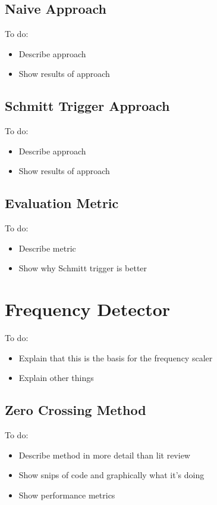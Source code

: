 \subsection{Naive Approach}

\color{red}
To do:
\begin{itemize}
	\item Describe approach
	\item Show results of approach
\end{itemize}
\color{black}

\subsection{Schmitt Trigger Approach}

\color{red}
To do:
\begin{itemize}
	\item Describe approach
	\item Show results of approach
\end{itemize}
\color{black}

\subsection{Evaluation Metric}

\color{red}
To do:
\begin{itemize}
	\item Describe metric
	\item Show why Schmitt trigger is better
\end{itemize}
\color{black}

\section{Frequency Detector}

\color{red}
To do:
\begin{itemize}
	\item Explain that this is the basis for the frequency scaler
	\item Explain other things
\end{itemize}
\color{black}

\subsection{Zero Crossing Method}

\color{red}
To do:
\begin{itemize}
	\item Describe method in more detail than lit review
	\item Show snips of code and graphically what it's doing
	\item Show performance metrics
\end{itemize}
\color{black}

